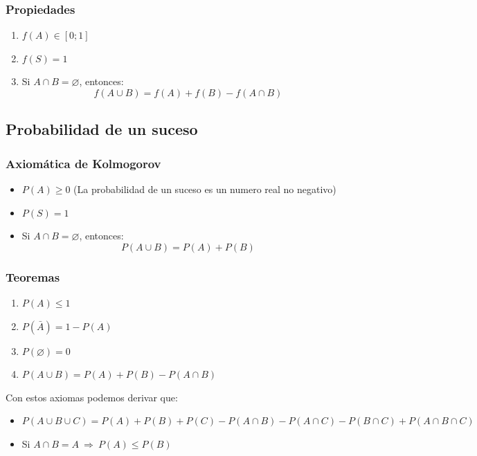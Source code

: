 \documentclass{article}
\newcommand{\Rightarrows}{\: \Rightarrow \:}            %
\begin{document}
\subsubsection{Propiedades}
\begin{enumerate}
    \item $f(A) \in [0;1]$
    \item $f(S) = 1$
    \item Si $A \cap B = \varnothing$, entonces:
    \begin{equation*}
        f(A \cup B) = f(A) + f(B) - f(A \cap B)
    \end{equation*}
\end{enumerate}

\subsection{Probabilidad de un suceso}
\subsubsection{Axiomática de Kolmogorov}
\begin{itemize}
    \item $P(A) \geq 0$ (La probabilidad de un suceso es un numero real no negativo)
    \item $P(S) = 1$
    \item Si $A \cap B = \varnothing$, entonces:
    \begin{equation*}
        P(A \cup B) = P(A) + P(B)
    \end{equation*}
\end{itemize}

\subsubsection{Teoremas}
\begin{enumerate}
    \item $P(A) \leq 1$
    \item $P(\bar{A}) = 1 - P(A)$
    \item $P(\varnothing) = 0$
    \item $P(A \cup B) = P(A) + P(B) - P(A \cap B)$
\end{enumerate}
Con estos axiomas podemos derivar que:
\begin{itemize}
    \item $P(A \cup B \cup C) = P(A) + P(B) + P(C) - P(A \cap B) - P(A \cap C) - P(B \cap C) + P(A \cap B \cap C)$
    \item Si $A \cap B = A \Rightarrows P(A) \leq P(B)$
\end{itemize}
\end{document}
